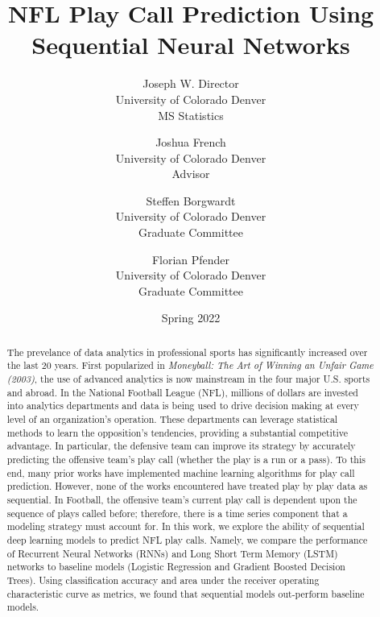 \documentclass{article}
\title{NFL Play Call Prediction Using Sequential Neural Networks}
\author{Joseph W. Director  \\
	University of Colorado Denver \\
    MS Statistics
	\and 
	Joshua French \\
	University of Colorado Denver \\
    Advisor
    \and
    Steffen Borgwardt \\
	University of Colorado Denver \\
    Graduate Committee
    \and
    Florian Pfender \\
	University of Colorado Denver \\
    Graduate Committee
	}
\date{Spring 2022}
\begin{document}
    
    \maketitle

    \begin{abstract}
        \centering\begin{minipage}{\dimexpr\paperwidth-12cm}
        The prevelance of data analytics in professional sports has significantly increased over the last 20 years. 
        First popularized in \emph{Moneyball: The Art of Winning an Unfair Game (2003)}, the use of advanced analytics is now mainstream in the four major U.S. sports and abroad. 
        In the National Football League (NFL), millions of dollars are invested into analytics departments and data is being used to drive decision making at every level of an organization's operation. 
        These departments can leverage statistical methods to learn the opposition's tendencies, providing a substantial competitive advantage. 
        In particular, the defensive team can improve its strategy by accurately predicting the offensive team's play call (whether the play is a run or a pass). 
        To this end, many prior works have implemented machine learning algorithms for play call prediction. 
        However, none of the works encountered have treated play by play data as sequential. 
        In Football, the offensive team's current play call is dependent upon the sequence of plays called before; therefore, there is a time series component that a modeling strategy must account for. 
        In this work, we explore the ability of sequential deep learning models to predict NFL play calls.
        Namely, we compare the performance of Recurrent Neural Networks (RNNs) and Long Short Term Memory (LSTM) networks to baseline models (Logistic Regression and Gradient Boosted Decision Trees). 
        Using classification accuracy and area under the receiver operating characteristic curve as metrics, we found that sequential models out-perform baseline models. 
        \end{minipage}
    \end{abstract}
    
    \pagebreak
\end{document}
